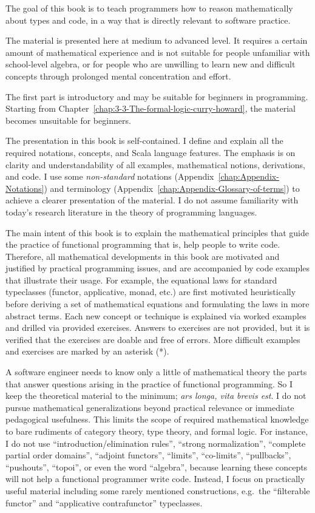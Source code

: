 

The goal of this book is to teach programmers how to reason mathematically
about types and code, in a way that is directly relevant to software
practice.

The material is presented here at medium to advanced level. It requires
a certain amount of mathematical experience and is not suitable for
people unfamiliar with school-level algebra, or for people who are
unwilling to learn new and difficult concepts through prolonged mental
concentration and effort.

The first part is introductory and may be suitable for beginners in
programming. Starting from Chapter~\ref{chap:3-3-The-formal-logic-curry-howard},
the material becomes unsuitable for beginners. 

The presentation in this book is self-contained. I define and explain
all the required notations, concepts, and Scala language features.
The emphasis is on clarity and understandability of all examples,
mathematical notions, derivations, and code. I use some \emph{non-standard}
notations (Appendix~\ref{chap:Appendix-Notations}) and terminology
(Appendix~\ref{chap:Appendix-Glossary-of-terms}) to achieve a clearer
presentation of the material. I do not assume familiarity with today's
research literature in the theory of programming languages.

The main intent of this book is to explain the mathematical principles
that guide the practice of functional programming \textendash{} that
is, help people to write code. Therefore, all mathematical developments
in this book are motivated and justified by practical programming
issues, and are accompanied by code examples that illustrate their
usage. For example, the equational laws for standard typeclasses (functor,
applicative, monad, etc.) are first motivated heuristically before
deriving a set of mathematical equations and formulating the laws
in more abstract terms. Each new concept or technique is explained
via worked examples and drilled via provided exercises. Answers to
exercises are not provided, but it is verified that the exercises
are doable and free of errors. More difficult examples and exercises
are marked by an asterisk ({*}).

A software engineer needs to know only a little of mathematical theory
\textendash{} the parts that answer questions arising in the practice
of functional programming. So I keep the theoretical material to the
minimum; \emph{ars longa, vita brevis est}. I do not pursue mathematical
generalizations beyond practical relevance or immediate pedagogical
usefulness. This limits the scope of required mathematical knowledge
to bare rudiments of category theory, type theory, and formal logic.
For instance, I do not use ``introduction/elimination rules'', ``strong
normalization'', ``complete partial order domains'', ``adjoint
functors'', ``limits'', ``co-limits'', ``pullbacks'', ``pushouts'',
``topoi'', or even the word ``algebra'', because learning these
concepts will not help a functional programmer write code. Instead,
I focus on practically useful material \textendash{} including some
rarely mentioned constructions, e.g.~the ``filterable functor''
and ``applicative contrafunctor'' typeclasses.

